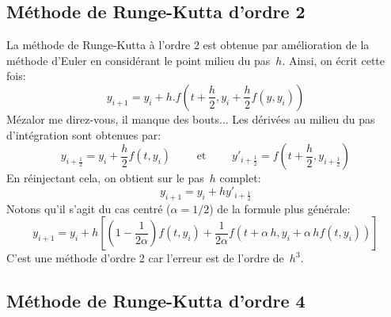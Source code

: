 \medskip
\subsection{Méthode de Runge-Kutta d'ordre 2} 

La méthode de Runge-Kutta à l'ordre 2 est obtenue par amélioration de la méthode d'Euler en considérant le point milieu du pas~$h$. Ainsi, on écrit cette fois:
\begin{equation}
y_{i+1}=y_i+h.f\left(t+\frac{h}2,y_i+\frac{h}2f(y,y_i)\right)
\end{equation}
Mézalor me direz-vous, il manque des bouts... Les dérivées au milieu du pas d'intégration sont obtenues par:
\begin{equation}
y_{i+\frac{1}{2}} = y_i + \frac{h}{2} f \left( t, y_i \right) \qquad \text{ et } \qquad y'_{i+\frac{1}{2}} = f \left( t + \frac{h}{2}, y_{i+\frac{1}{2}} \right)
\end{equation}
En réinjectant cela, on obtient sur le pas~$h$ complet:
\begin{equation}
y_{i+1} = y_i + h y'_{i+\frac{1}{2}}
\end{equation}
Notons qu'il s'agit du cas centré ($\alpha=1/2$) de la formule plus générale:
\begin{equation}
y_{i+1} = y_i + h\left[\left(1-\frac1{2\alpha}\right)f \left( t, y_i \right) + \frac1{2\alpha}f \left( t + \alpha\,h, y_i + \alpha\,h f \left( t, y_i \right) \right)\right]
\end{equation}
C'est une méthode d'ordre 2 car l'erreur est de l'ordre de~$h^3$. 

\medskip
\subsection{Méthode de Runge-Kutta d'ordre 4} 

